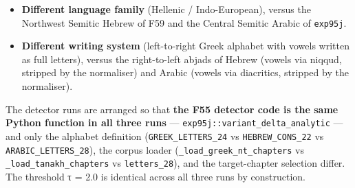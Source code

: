 \documentclass[
]{article}
\providecommand{\tightlist}{%
  \setlength{\itemsep}{0pt}\setlength{\parskip}{0pt}}
\begin{document}
\begin{itemize}
\tightlist
\item
  \textbf{Different language family} (Hellenic / Indo-European), versus
  the Northwest Semitic Hebrew of F59 and the Central Semitic Arabic of
  \texttt{exp95j}.
\item
  \textbf{Different writing system} (left-to-right Greek alphabet with
  vowels written as full letters), versus the right-to-left abjads of
  Hebrew (vowels via niqqud, stripped by the normaliser) and Arabic
  (vowels via diacritics, stripped by the normaliser).
\end{itemize}

The detector runs are arranged so that \textbf{the F55 detector code is
the same Python function in all three runs} ---
\texttt{exp95j::variant\_delta\_analytic} --- and only the alphabet
definition (\texttt{GREEK\_LETTERS\_24} vs \texttt{HEBREW\_CONS\_22} vs
\texttt{ARABIC\_LETTERS\_28}), the corpus loader
(\texttt{\_load\_greek\_nt\_chapters} vs
\texttt{\_load\_tanakh\_chapters} vs \texttt{letters\_28}), and the
target-chapter selection differ. The threshold τ = 2.0 is identical
across all three runs by construction.
\end{document}
